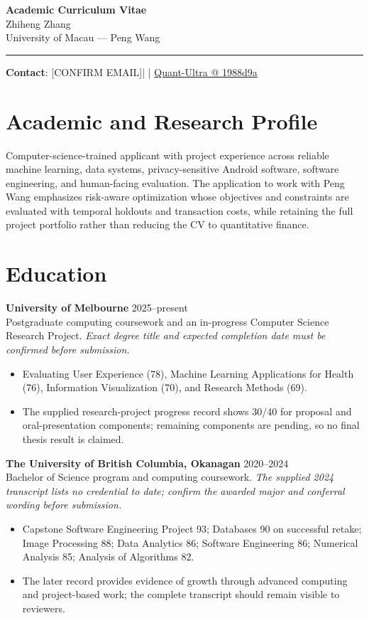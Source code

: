 \documentclass[11pt]{article}
\makeatletter
\newcommand{\ApplicantName}{Zhiheng Zhang}
\newcommand{\ApplicantEmail}{[CONFIRM EMAIL]}
\newcommand{\ApplicantPhone}{[CONFIRM PHONE]}
\newcommand{\ApplicantGitHub}{\href{https://github.com/zhiheng-zhang-Mera/Quant-Ultra/tree/1988d9a8530da91a8158de864d098ea869098923}{Quant-Ultra @ 1988d9a}}
\makeatother
\begin{document}
\begin{center}
{\LARGE\bfseries Academic Curriculum Vitae}\\[0.25em]
{\large \ApplicantName}\\
University of Macau --- Peng Wang
\end{center}
\vspace{0.35em}\hrule\vspace{0.65em}

\textbf{Contact}: \ApplicantEmail\quad | \quad \ApplicantPhone\quad | \quad \ApplicantGitHub

\section*{Academic and Research Profile}
Computer-science-trained applicant with project experience across reliable machine learning, data systems, privacy-sensitive Android software, software engineering, and human-facing evaluation. The application to work with Peng Wang emphasizes risk-aware optimization whose objectives and constraints are evaluated with temporal holdouts and transaction costs, while retaining the full project portfolio rather than reducing the CV to quantitative finance.

\section*{Education}
\textbf{University of Melbourne} \hfill 2025--present\\
Postgraduate computing coursework and an in-progress Computer Science Research Project. \textit{Exact degree title and expected completion date must be confirmed before submission.}
\begin{itemize}
\item Evaluating User Experience (78), Machine Learning Applications for Health (76), Information Visualization (70), and Research Methods (69).
\item The supplied research-project progress record shows 30/40 for proposal and oral-presentation components; remaining components are pending, so no final thesis result is claimed.
\end{itemize}

\textbf{The University of British Columbia, Okanagan} \hfill 2020--2024\\
Bachelor of Science program and computing coursework. \textit{The supplied 2024 transcript lists no credential to date; confirm the awarded major and conferral wording before submission.}
\begin{itemize}
\item Capstone Software Engineering Project 93; Databases 90 on successful retake; Image Processing 88; Data Analytics 86; Software Engineering 86; Numerical Analysis 85; Analysis of Algorithms 82.
\item The later record provides evidence of growth through advanced computing and project-based work; the complete transcript should remain visible to reviewers.
\end{itemize}
\end{document}
